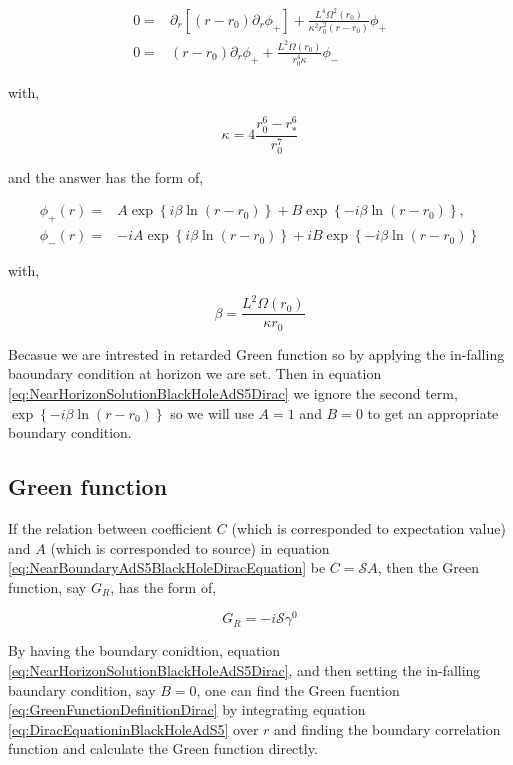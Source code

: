 \begin{align}
    0 =& \partial_r\left[(r-r_0)\partial_r\phi_{+}\right] + \frac{L^4\Omega^2(r_0)}{\kappa^2r_0^2(r-r_0)}\phi_{+}\nonumber\\
    0 =&  (r-r_0) \partial_r \phi_{+} +  \frac{L^2\Omega(r_0)}{r_0^4\kappa} \phi_{-}
\end{align}

with,

\begin{equation}
   \kappa = 4\frac{r_0^6 - r_*^6}{r_0^7}
\end{equation}

and the answer has the form of,

\begin{align} \label{eq:NearHorizonSolutionBlackHoleAdS5Dirac}
   \phi_{+}(r) =& A\exp\left\{i\beta\ln{(r-r_0)}\right\} + B\exp\left\{-i\beta\ln{(r-r_0)}\right\}, \nonumber\\
   \phi_{-}(r) =&-iA\exp\left\{i\beta\ln{(r-r_0)}\right\} + iB\exp\left\{-i\beta\ln{(r-r_0)}\right\}
\end{align}

with,

\begin{equation}
   \beta = \frac{L^2\Omega(r_0)}{\kappa r_0}
\end{equation}

Becasue we are intrested in retarded Green function so by applying the in-falling baoundary condition at horizon we are set. Then in equation \ref{eq:NearHorizonSolutionBlackHoleAdS5Dirac} we ignore the second term, $\exp\left\{-i\beta\ln{(r-r_0)}\right\}$ so we will use $A=1$ and $B=0$ to get an appropriate boundary condition. 

\subsection{Green function}

If the relation between coefficient $C$ (which is corresponded to expectation value) and $A$ (which is corresponded to source) in equation \ref{eq:NearBoundaryAdS5BlackHoleDiracEquation} be $C=\mathcal{S}A$, then the Green function, say $G_R$, has the form of,

\begin{equation} \label{eq:GreenFunctionDefinitionDirac}
   G_R = -i\mathcal{S}\gamma^0
\end{equation}  

By having the boundary conidtion, equation \ref{eq:NearHorizonSolutionBlackHoleAdS5Dirac}, and then setting the in-falling baundary condition, say $B=0$, one can find the Green fucntion \ref{eq:GreenFunctionDefinitionDirac} by integrating equation \ref{eq:DiracEquationinBlackHoleAdS5} over $r$ and finding the boundary correlation function and calculate the Green function directly. 

